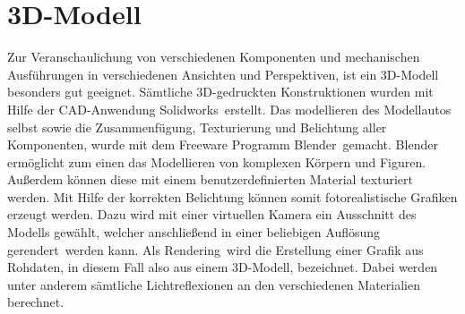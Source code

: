 \section{3D-Modell}
\label{sec:3Dmodel}
Zur Veranschaulichung von verschiedenen Komponenten und mechanischen Ausführungen in verschiedenen Ansichten und Perspektiven, ist ein 3D-Modell besonders gut geeignet. Sämtliche 3D-gedruckten Konstruktionen wurden mit Hilfe der \ac{CAD}-Anwendung \glqq Solidworks\grqq\ erstellt. Das modellieren des Modellautos selbst sowie die Zusammenfügung, Texturierung und Belichtung aller Komponenten, wurde mit dem Freeware Programm \glqq Blender\grqq\ gemacht. Blender ermöglicht zum einen das Modellieren von komplexen Körpern und Figuren. Außerdem können diese mit einem benutzerdefinierten Material texturiert werden. Mit Hilfe der korrekten Belichtung können somit fotorealistische Grafiken erzeugt werden. Dazu wird mit einer virtuellen Kamera ein Ausschnitt des Modells gewählt, welcher anschließend in einer beliebigen Auflösung \glqq gerendert\grqq\ werden kann. Als \glqq Rendering\grqq\ wird die Erstellung einer Grafik aus Rohdaten, in diesem Fall also aus einem 3D-Modell, bezeichnet. Dabei werden unter anderem sämtliche Lichtreflexionen an den verschiedenen Materialien berechnet.